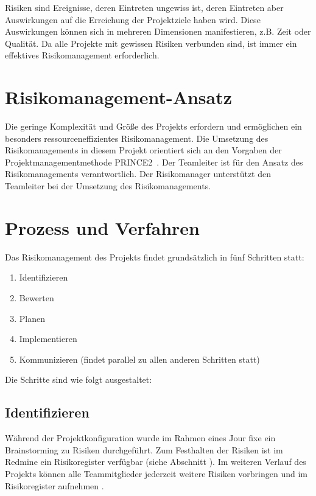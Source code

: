\documentclass[a4paper,11pt,listof=numbered,glossary=totoc,parskip=half,toc=bib]{scrreprt}
\begin{document}
{Risiken sind Ereignisse, deren Eintreten ungewiss ist, deren Eintreten aber Auswirkungen auf die Erreichung der Projektziele haben wird. Diese Auswirkungen können sich in mehreren Dimensionen manifestieren, z.B. Zeit oder Qualität. Da alle Projekte mit gewissen Risiken verbunden sind, ist immer ein effektives Risikomanagement erforderlich. 

\section{Risikomanagement-Ansatz}

Die geringe Komplexität und Größe des Projekts erfordern und ermöglichen ein besonders ressourceneffizientes Risikomanagement. Die Umsetzung des Risikomanagements in diesem Projekt orientiert sich an den Vorgaben der Projektmanagementmethode PRINCE2\textregistered\ \autocite[S. 119-136, S. 327-330]{Prince2}.
Der Teamleiter ist für den Ansatz des Risikomanagements verantwortlich. Der Risikomanager unterstützt den Teamleiter bei der Umsetzung des Risikomanagements.

\section{Prozess und Verfahren}

Das Risikomanagement des Projekts findet grundsätzlich in fünf Schritten statt:

\begin{enumerate}
	\item Identifizieren
	\item Bewerten
	\item Planen
	\item Implementieren
	\item Kommunizieren (findet parallel zu allen anderen Schritten statt)
\end{enumerate}

Die Schritte sind wie folgt ausgestaltet:

\subsection{Identifizieren}

Während der Projektkonfiguration wurde im Rahmen eines Jour fixe ein Brainstorming zu Risiken durchgeführt. Zum Festhalten der Risiken ist im Redmine ein Risikoregister verfügbar (siehe Abschnitt ). Im weiteren Verlauf des Projekts können alle Teammitglieder jederzeit weitere Risiken vorbringen und im Risikoregister aufnehmen .

}
\end{document}
